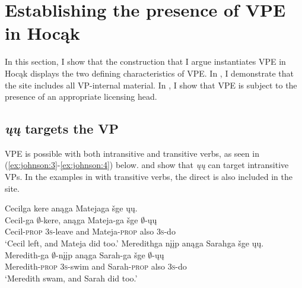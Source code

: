 \documentclass[output=paper]{LSP/langsci}
\begin{document}
\section{Establishing the presence of VPE in Hocąk}\label{sec:johnson:2}

 
In this section, I show that the construction that I argue instantiates VPE in Hocąk displays the two defining characteristics of VPE. In , I demonstrate that the  site includes all VP-internal material. In , I show that VPE is subject to the presence of an appropriate licensing head.
 

\subsection{\emph{ųų} targets the VP}\label{sec:johnson:2.1}

VPE is possible with both intransitive and transitive verbs, as seen in (\ref{ex:johnson:3}-\ref{ex:johnson:4}) below.  and  show that \emph{ųų} can target intransitive VPs. In the examples in  with transitive verbs, the direct  is also included in the  site.
 
\let\eachwordtwo=\itshape
 
\ea\label{ex:johnson:3}
\ea\label{ex:johnson:3a} 
\glll Cecilga {\ob}{\sVP} kere{\cb} anąga Matejaga šge {\ob}ųų{\cb}.\\
Cecil-ga {} $\emptyset$-kere, anąga Mateja-ga šge {\db}$\emptyset$-ųų\\
Cecil-\textsc{prop} {} \textsc {3s}-leave and Mateja-\textsc{prop} also {\db}\textsc{3s}-do\\
\trans `Cecil left, and Mateja did too.' 
\ex\label{ex:johnson:3b} 
\glll Meredithga {\ob}{\sVP} nįįp{\cb} anąga Sarahga šge {\ob}ųų{\cb}.\\
Meredith-ga {} $\emptyset$-nįįp anąga Sarah-ga šge {\db}$\emptyset$-ųų\\
Meredith-\textsc {prop} {} \textsc{3s}-swim and Sarah-\textsc{prop} also {\db}\textsc{3s}-do\\
\trans `Meredith swam, and Sarah did too.'
\z
\z
 
\end{document}
